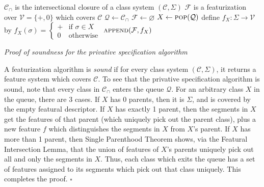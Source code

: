 \documentclass[11pt, oneside]{article}   	%
\begin{document}
\noindent \begin{algorithmic}
    \REQUIRE $\mathcal C_\cap$ is the intersectional closure of a class system $(\mathcal C, \Sigma)$
    \ENSURE $\mathcal F$ is a featurization over $\mathcal V = \{ +, 0 \}$ which covers $\mathcal C$
    \STATE
    \STATE $\mathcal Q \leftarrow \mathcal C_\cap$
    \STATE $\mathcal F \leftarrow \varnothing$
    \STATE
        \STATE $X \leftarrow \textsc{pop}(\mathcal Q)$
            \STATE define $f_X : \Sigma \rightarrow \mathcal V$ by $f_X(\sigma) = \begin{cases}
                + & \mbox{if } \sigma \in X \\
                0 & \mbox{otherwise}
                \end{cases} $
            \STATE $\textsc{append}(\mathcal F, f_X)$
        \ENDIF
    \ENDWHILE
\end{algorithmic}

\vspace{\baselineskip} \noindent \textit{Proof of soundness for the privative specification algorithm}

A featurization algorithm is \textit{sound} if for every class system $(\mathcal C, \Sigma)$, it returns a feature system which covers $\mathcal C$. To see that the privative specification algorithm is sound, note that every class in $\mathcal C_\cap$ enters the queue $\mathcal Q$. For an arbitrary class $X$ in the queue, there are 3 cases. If $X$ has 0 parents, then it is $\Sigma$, and is covered by the empty featural descriptor. If $X$ has exactly 1 parent, then the segments in $X$ get the features of that parent (which uniquely pick out the parent class), plus a new feature $f$ which distinguishes the segments in $X$ from $X$'s parent. If $X$ has more than 1 parent, then Single Parenthood Theorem shows, via the Featural Intersection Lemma, that the union of features of $X$'s parents uniquely pick out all and only the segments in $X$. Thus, each class which exits the queue has a set of features assigned to its segments which pick out that class uniquely. This completes the proof. $\square$
\end{document}
